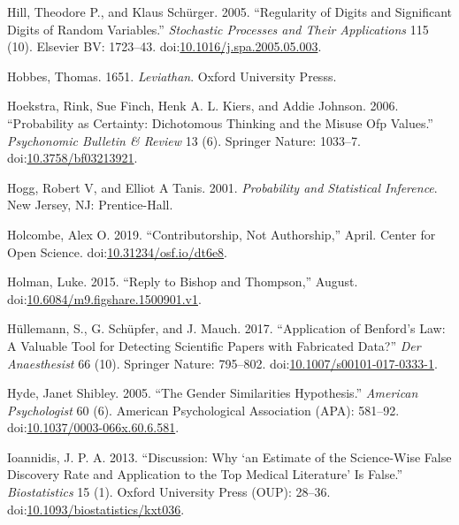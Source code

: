 \documentclass[a5paper]{book}
\begin{document}
\hypertarget{ref-doi:10.1016ux2fj.spa.2005.05.003}{}
Hill, Theodore P., and Klaus Schürger. 2005. ``Regularity of Digits and
Significant Digits of Random Variables.'' \emph{Stochastic Processes and
Their Applications} 115 (10). Elsevier BV: 1723--43.
doi:\href{https://doi.org/10.1016/j.spa.2005.05.003}{10.1016/j.spa.2005.05.003}.

\hypertarget{ref-leviathan}{}
Hobbes, Thomas. 1651. \emph{Leviathan}. Oxford University Presss.

\hypertarget{ref-doi:10.3758ux2fbf03213921}{}
Hoekstra, Rink, Sue Finch, Henk A. L. Kiers, and Addie Johnson. 2006.
``Probability as Certainty: Dichotomous Thinking and the Misuse Ofp
Values.'' \emph{Psychonomic Bulletin \& Review} 13 (6). Springer Nature:
1033--7.
doi:\href{https://doi.org/10.3758/bf03213921}{10.3758/bf03213921}.

\hypertarget{ref-hogg-tanis}{}
Hogg, Robert V, and Elliot A Tanis. 2001. \emph{Probability and
Statistical Inference}. New Jersey, NJ: Prentice-Hall.

\hypertarget{ref-doi:10.31234ux2fosf.ioux2fdt6e8}{}
Holcombe, Alex O. 2019. ``Contributorship, Not Authorship,'' April.
Center for Open Science.
doi:\href{https://doi.org/10.31234/osf.io/dt6e8}{10.31234/osf.io/dt6e8}.

\hypertarget{ref-doi:10.6084ux2fm9.figshare.1500901.v1}{}
Holman, Luke. 2015. ``Reply to Bishop and Thompson,'' August.
doi:\href{https://doi.org/10.6084/m9.figshare.1500901.v1}{10.6084/m9.figshare.1500901.v1}.

\hypertarget{ref-doi:10.1007ux2fs00101-017-0333-1}{}
Hüllemann, S., G. Schüpfer, and J. Mauch. 2017. ``Application of
Benford's Law: A Valuable Tool for Detecting Scientific Papers with
Fabricated Data?'' \emph{Der Anaesthesist} 66 (10). Springer Nature:
795--802.
doi:\href{https://doi.org/10.1007/s00101-017-0333-1}{10.1007/s00101-017-0333-1}.

\hypertarget{ref-doi:10.1037ux2f0003-066x.60.6.581}{}
Hyde, Janet Shibley. 2005. ``The Gender Similarities Hypothesis.''
\emph{American Psychologist} 60 (6). American Psychological Association
(APA): 581--92.
doi:\href{https://doi.org/10.1037/0003-066x.60.6.581}{10.1037/0003-066x.60.6.581}.

\hypertarget{ref-doi:10.1093ux2fbiostatisticsux2fkxt036}{}
Ioannidis, J. P. A. 2013. ``Discussion: Why `an Estimate of the
Science-Wise False Discovery Rate and Application to the Top Medical
Literature' Is False.'' \emph{Biostatistics} 15 (1). Oxford University
Press (OUP): 28--36.
doi:\href{https://doi.org/10.1093/biostatistics/kxt036}{10.1093/biostatistics/kxt036}.
\end{document}
